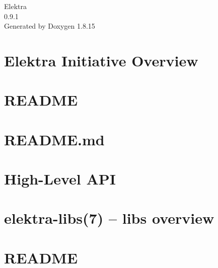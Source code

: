 \let\mypdfximage\pdfximage\def\pdfximage{\immediate\mypdfximage}\documentclass[twoside]{book}
\newcommand{\+}{\discretionary{\mbox{\scriptsize$\hookleftarrow$}}{}{}}
\newcommand{\clearemptydoublepage}{%
  \newpage{\pagestyle{empty}\cleardoublepage}%
}
\begin{document}
\hypersetup{pageanchor=false,
             bookmarksnumbered=true,
             pdfencoding=unicode
            }
\begin{titlepage}
\vspace*{7cm}
\begin{center}%
{\Large Elektra \\[1ex]\large 0.\+9.\+1 }\\
\vspace*{1cm}
{\large Generated by Doxygen 1.8.15}\\
\end{center}
\end{titlepage}
\clearemptydoublepage
{}
\tableofcontents
\clearemptydoublepage
{}
\hypersetup{pageanchor=true}

\chapter{Elektra Initiative Overview}
\label{index}\hypertarget{index}{}
\chapter{R\+E\+A\+D\+ME}
\label{md_src_libs_elektra_README}

\chapter{R\+E\+A\+D\+M\+E.\+md}
\label{src_libs_getenv_README_md}

\chapter{High-\/\+Level A\+PI}
\label{src_libs_highlevel_README_md}

\chapter{elektra-\/libs(7) -- libs overview}
\label{src_libs_README_md}

\chapter{R\+E\+A\+D\+ME}
\label{md_src_bindings_io_doc_README}

\end{document}
